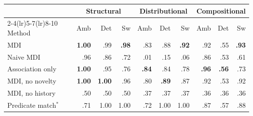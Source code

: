 \begin{tabular}{@{}lrrrrrrrrr@{}}
\toprule
 & \multicolumn{3}{c}{Structural} & \multicolumn{3}{c}{Distributional} & \multicolumn{3}{c}{Compositional} \\
\cmidrule(lr){2-4}\cmidrule(lr){5-7}\cmidrule(lr){8-10}
Method & Amb & Det & Sw & Amb & Det & Sw & Amb & Det & Sw \\
\midrule
MDI & \textbf{1.00} & .99 & \textbf{.98} & .83 & .88 & \textbf{.92} & .92 & .55 & \textbf{.93} \\
Naive MDI & .96 & .86 & .72 & .01 & .15 & .06 & .86 & .53 & .61 \\
Association only & \textbf{1.00} & .95 & .76 & \textbf{.84} & .84 & .78 & \textbf{.96} & \textbf{.56} & .73 \\
MDI, no novelty & \textbf{1.00} & \textbf{1.00} & .96 & .80 & \textbf{.89} & .87 & .92 & .53 & .92 \\
MDI, no history & .50 & .50 & .50 & .37 & .37 & .37 & .36 & .36 & .36 \\
Predicate match$^{*}$ & .71 & 1.00 & 1.00 & .72 & 1.00 & 1.00 & .87 & .57 & .88 \\
\bottomrule
\end{tabular}
